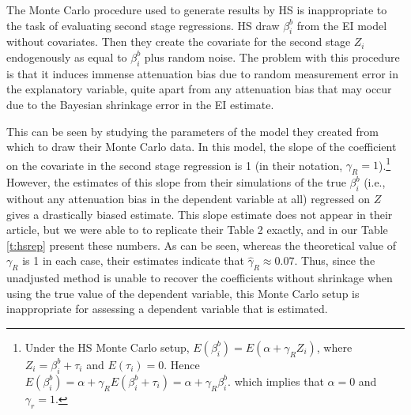 \documentclass[11pt,titlepage]{article}
\begin{document}
The Monte Carlo procedure used to generate results by HS is
inappropriate to the task of evaluating second stage regressions.  HS
draw $\beta_i^b$ from the EI model without covariates.  Then they
create the covariate for the second stage $Z_i$ endogenously as equal
to $\beta_i^b$ plus random noise.  The problem with this procedure is
that it induces immense attenuation bias due to random measurement
error in the explanatory variable, quite apart from any attenuation
bias that may occur due to the Bayesian shrinkage error in the EI
estimate.

This can be seen by studying the parameters of the model they created
from which to draw their Monte Carlo data.  In this model, the slope
of the coefficient on the covariate in the second stage regression is
1 (in their notation, $\gamma_R=1$).\footnote{Under the HS Monte Carlo
  setup, $E(\beta_i^b)=E(\alpha+\gamma_R Z_i)$, where
  $Z_i=\beta_i^b+\tau_i$ and $E(\tau_i)=0$.  Hence
  $E(\beta_i^b)=\alpha+\gamma_RE(\beta_i^b+\tau_i)=\alpha+\gamma_R\beta_i^b$.
  which implies that $\alpha=0$ and $\gamma_r=1$.}  However, the
estimates of this slope from their simulations of the true $\beta_i^b$
(i.e., without any attenuation bias in the dependent variable at all)
regressed on $Z$ gives a drastically biased estimate.  This slope
estimate does not appear in their article, but we were able to to
replicate their Table 2 exactly, and in our Table \ref{t:hsrep}
present these numbers.  As can be seen, whereas the theoretical value
of $\gamma_R$ is 1 in each case, their estimates indicate that
$\hat\gamma_R\approx 0.07$.  Thus, since the unadjusted method is
unable to recover the coefficients without shrinkage when using the
true value of the dependent variable, this Monte Carlo setup is
inappropriate for assessing a dependent variable that is estimated.
\end{document}
